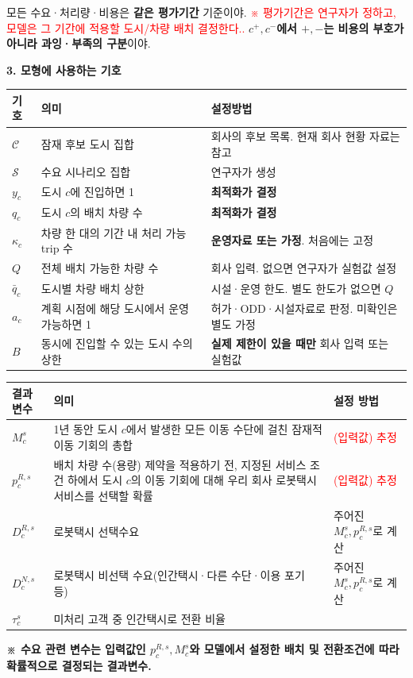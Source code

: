 \documentclass[11pt,a4paper]{article}
\newcommand{\blocktitle}[1]{\par\bigskip\noindent\textbf{\large #1}\par\smallskip}
\begin{document}
모든 수요·처리량·비용은 \textbf{같은 평가기간} 기준이야. \textcolor{red}{※ 평가기간은 연구자가 정하고, 모델은 그 기간에 적용할 도시/차량 배치 결정한다..} \textbf{$c^+,c^-$에서 $+,-$는 비용의 부호가 아니라 과잉·부족의 구분}이야.


\blocktitle{3. 모형에 사용하는 기호}
\begin{longtable}{@{}P{0.12\textwidth}P{0.34\textwidth}P{0.46\textwidth}@{}}
\toprule
기호 & 의미 & 설정방법 \\
\midrule
\endhead
$\mathcal C$ & 잠재 후보 도시 집합 & 회사의 후보 목록. 현재 회사 현황 자료는 참고 \\
$\mathcal S$ & 수요 시나리오 집합 & 연구자가 생성 \\
$y_c$ & 도시 $c$에 진입하면 1 & \textbf{최적화가 결정} \\
$q_c$ & 도시 $c$의 배치 차량 수 & \textbf{최적화가 결정} \\
$\kappa_c$ & 차량 한 대의 기간 내 처리 가능 trip 수 & \textbf{운영자료 또는 가정}. 처음에는 고정 \\
$Q$ & 전체 배치 가능한 차량 수 & 회사 입력. 없으면 연구자가 실험값 설정 \\
$\bar q_c$ & 도시별 차량 배치 상한 & 시설·운영 한도. 별도 한도가 없으면 $Q$ \\
$a_c$ & 계획 시점에 해당 도시에서 운영 가능하면 1 & 허가·ODD·시설자료로 판정. 미확인은 별도 가정 \\
$B$ & 동시에 진입할 수 있는 도시 수의 상한 & \textbf{실제 제한이 있을 때만} 회사 입력 또는 실험값 \\
\bottomrule
\end{longtable}

\begin{longtable}{@{}P{0.16\textwidth}P{0.42\textwidth}P{0.34\textwidth}@{}}
\toprule
결과변수 & 의미 & 설정 방법 \\
\midrule
\endhead
$M_c^s$ & 1년 동안 도시 $c$에서 발생한 모든 이동 수단에 걸친 잠재적 이동 기회의 총합 & \textcolor{red}{(입력값) 추정}\\
$p_c^{R,s}$ & 배치 차량 수(용량) 제약을 적용하기 전, 지정된 서비스 조건 하에서 도시 $c$의 이동 기회에 대해 우리 회사 로봇택시 서비스를 선택할 확률 & \textcolor{red}{(입력값) 추정}\\
$D_c^{R,s}$ & 로봇택시 선택수요 & 주어진 $M_c^s, p_c^{R,s}$로 계산 \\
$D_c^{N,s}$ & 로봇택시 비선택 수요(인간택시·다른 수단·이용 포기 등) & 주어진 $M_c^s, p_c^{R,s}$로 계산 \\
$\tau_c^s$ & 미처리 고객 중 인간택시로 전환 비율 & \\
\bottomrule
\end{longtable}
\textbf{※ 수요 관련 변수는 입력값인 $p_c^{R,s}, M_c^s$와 모델에서 설정한 배치 및 전환조건에 따라 확률적으로 결정되는 결과변수.}
\end{document}
